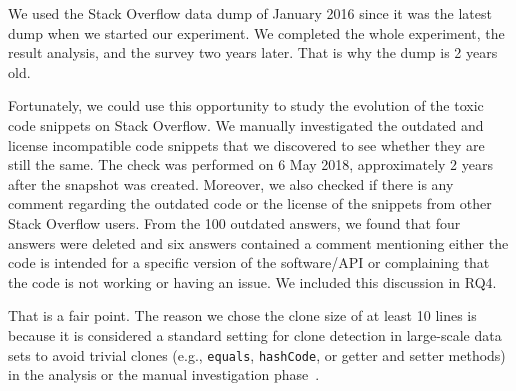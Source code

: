 \documentclass[a4paper,twoside,10pt]{reviewresponse}
\begin{document}

We used the Stack Overflow data dump of January 2016 since it was the latest
dump when we started our experiment. We completed the whole
experiment, the result analysis, and the survey two years later. That is why the
dump is 2 years old.

Fortunately, we could use this opportunity to study the evolution of the toxic
code snippets on Stack Overflow. We manually investigated the outdated and
license incompatible code snippets that we discovered to see whether they are
still the same. The check was performed on 6 May 2018, approximately 2 years
after the snapshot was created. Moreover, we also checked if there is any
comment regarding the outdated code or the license of the snippets from other
Stack Overflow users. From the 100 outdated answers, we found that four answers
were deleted and six answers contained a comment mentioning either the code is
intended for a specific version of the software/API or complaining that the code
is not working or having an issue. We included this discussion in RQ4.


That is a fair point. The reason we chose the clone size of at least 10 lines is
because it is considered a standard setting for clone detection in large-scale
data sets to avoid trivial clones (e.g., \texttt{equals}, \texttt{hashCode}, or
getter and setter methods) in the analysis or the manual investigation
phase~\citep{Sajnani2016}.
\end{document}
